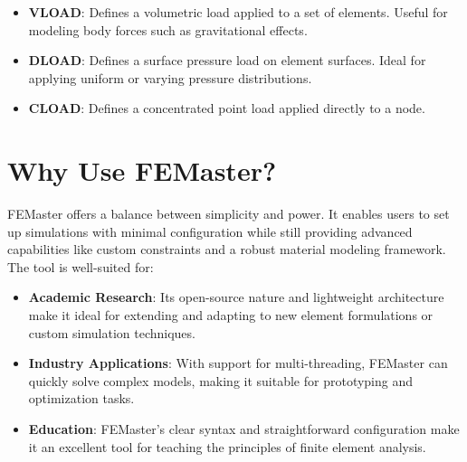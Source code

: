 \begin{itemize}
    \item \textbf{VLOAD}: Defines a volumetric load applied to a set of elements. Useful for modeling body forces such as gravitational effects.
    \item \textbf{DLOAD}: Defines a surface pressure load on element surfaces. Ideal for applying uniform or varying pressure distributions.
    \item \textbf{CLOAD}: Defines a concentrated point load applied directly to a node.
\end{itemize}

\section{Why Use FEMaster?}
FEMaster offers a balance between simplicity and power. It enables users to set up simulations with minimal configuration while still providing advanced capabilities like custom constraints and a robust material modeling framework. The tool is well-suited for:

\begin{itemize}
    \item \textbf{Academic Research}: Its open-source nature and lightweight architecture make it ideal for extending and adapting to new element formulations or custom simulation techniques. 
    \item \textbf{Industry Applications}: With support for multi-threading, FEMaster can quickly solve complex models, making it suitable for prototyping and optimization tasks.
    \item \textbf{Education}: FEMaster’s clear syntax and straightforward configuration make it an excellent tool for teaching the principles of finite element analysis.
\end{itemize}

